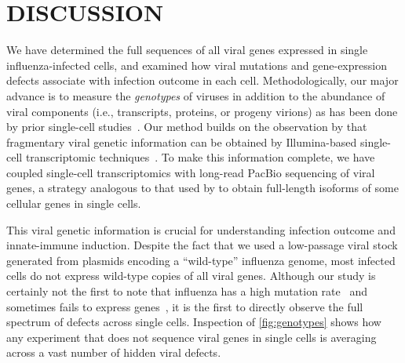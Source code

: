 \documentclass[10pt,letterpaper]{article}
\newcommand{\FIG}[1]{\autoref{fig:#1}}
\begin{document}
\section*{DISCUSSION}
We have determined the full sequences of all viral genes expressed in single influenza-infected cells, and examined how viral mutations and gene-expression defects associate with infection outcome in each cell.
Methodologically, our major advance is to measure the \emph{genotypes} of viruses in addition to the abundance of viral components (i.e., transcripts, proteins, or progeny virions) as has been done by prior single-cell studies~\citep{russell2018extreme, zanini2018single, zanini2018virus, steuerman2018dissection, saikia2018simultaneous, oneal2018west, zhu2009growth, schulte2014single, akpinar2016high, heldt2015single, brooke2013most}.
Our method builds on the observation by that fragmentary viral genetic information can be obtained by Illumina-based single-cell transcriptomic techniques~\citep{saikia2018simultaneous, zanini2018virus}.
To make this information complete, we have coupled single-cell transcriptomics with long-read PacBio sequencing of viral genes, a strategy analogous to that used by \citep{gupta2018single} to obtain full-length isoforms of some cellular genes in single cells.

This viral genetic information is crucial for understanding infection outcome and innate-immune induction.
Despite the fact that we used a low-passage viral stock generated from plasmids encoding a ``wild-type'' influenza genome, most infected cells do not express wild-type copies of all viral genes.
Although our study is certainly not the first to note that influenza has a high mutation rate~\citep{parvin1986measurement, suarez1992heterogeneity, bloom2014experimentally, pauly2017novel} and sometimes fails to express genes~\citep{brooke2013most, heldt2015single, dou2017analysis, russell2018extreme}, it is the first to directly observe the full spectrum of defects across single cells.
Inspection of \FIG{genotypes} shows how any experiment that does not sequence viral genes in single cells is averaging across a vast number of hidden viral defects.
\end{document}
